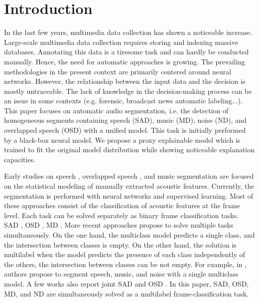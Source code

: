 \section{Introduction}

In the last few years, multimedia data collection has shown a noticeable increase.
Large-scale multimedia data collection requires storing and indexing massive databases.
Annotating this data is a tiresome task and can hardly be conducted manually.
Hence, the need for automatic approaches is growing.
The prevailing methodologies in the present context are primarily centered around neural networks.
However, the relationship between the input data and the decision is mostly untraceable.
The lack of knowledge in the decision-making process can be an issue in some contexts (e.g. forensic, broadcast news automatic labeling...). 
This paper focuses on automatic audio segmentation, i.e. the detection of homogeneous segments containing speech (SAD), music (MD), noise (ND), and overlapped speech (OSD) with a unified model.
This task is initially performed by a black-box neural model. 
We propose a proxy explainable model which is trained to fit the original model distribution while showing noticeable explanation capacities. 

Early studies on speech \cite{sohn1999statistical}, overlapped speech \cite{charlet_impact_2013}, and music \cite{lavner2009decision} segmentation are focused on the statistical modeling of manually extracted acoustic features.
Currently, the segmentation is performed with neural networks and supervised learning.
Most of these approaches consist of the classification of acoustic features at the frame level.
Each task can be solved separately as binary frame classification tasks.
SAD \cite{lavechin2019end}, OSD \cite{bullock_overlap-aware_2020,lebourdais22_interspeech}, MD \cite{jang2019music,de2019exploring}.
More recent approaches propose to solve multiple tasks simultaneously. 
On the one hand, the multiclass model predicts a single class, and the intersection between classes is empty. 
On the other hand, the solution is multilabel when the model predicts the presence of each class independently of the others, the intersection between classes can be not empty.
For example, in \cite{gimeno2020multiclass}, authors propose to segment speech, music, and noise with a single multiclass model.
A few works also report joint SAD and OSD \cite{jung21_interspeech,bredin21_interspeech,lebourdais2023joint}.
In this paper, SAD, OSD, MD, and ND are simultaneously solved as a multilabel frame-classification task.

